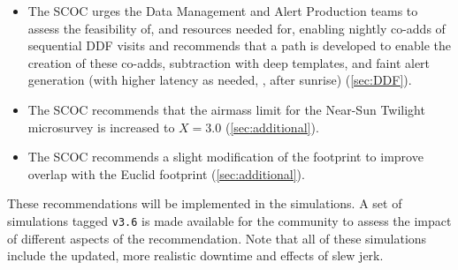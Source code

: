 \begin{itemize}
\item The SCOC urges the Data Management and Alert Production teams to assess the feasibility of, and resources needed for, enabling nightly co-adds of sequential DDF visits and recommends that a path is developed to enable the creation of these co-adds, subtraction with deep templates, and faint alert generation (with higher latency as needed, \eg , after sunrise) (\autoref{sec:DDF}). 

\item The SCOC recommends that the airmass limit for the Near-Sun Twilight microsurvey is increased to $X=3.0$ (\autoref{sec:additional}).

\item The SCOC recommends a slight modification of the  footprint to improve overlap with the Euclid footprint (\autoref{sec:additional}). 

\end{itemize}

These recommendations will be implemented in the  simulations. A set of simulations tagged \texttt{v3.6} is made available for the community to assess the impact of different aspects of the recommendation. Note that all of these simulations include the updated, more realistic downtime and effects of slew jerk. 

